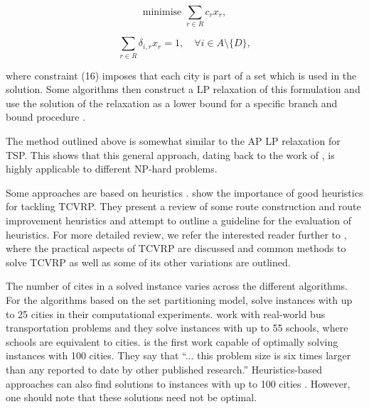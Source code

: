 \documentclass{mprop}
\theoremstyle{definition}
\begin{document}
\begin{equation}
\label{eq:tcvrpobjfunc}
\textrm{minimise } \sum_{r \in R} c_{r} x_{r},
\end{equation}

\begin{equation}
\label{eq:tcvrpconstraint1}
\sum_{r \in R} \delta_{i,r} x_{r} = 1, \quad \forall i \in A \setminus \{D\},
\end{equation}

where constraint (16) imposes that each city is part of a set which is used in the solution. Some algorithms then construct a LP relaxation of this formulation and use the solution of the relaxation as a lower bound for a specific branch and bound procedure \citep{Desrochers92,Agarwal89}.

The method outlined above is somewhat similar to the AP LP relaxation for TSP. This shows that this general approach, dating back to the work of \citet{Dantzig54}, is highly applicable to different NP-hard problems.

Some approaches are based on heuristics \citep{Tan99heuristicmethods,Cheng09}. \citet{Braysy05,Braysy05a} show the importance of good heuristics for tackling TCVRP. They present a review of some route construction and route improvement heuristics and attempt to outline a guideline for the evaluation of heuristics.
For more detailed review, we refer the interested reader further to \citet{Toth14}, where the practical aspects of TCVRP are discussed and common methods to solve TCVRP as well as some of its other variations are outlined.

The number of cites in a solved instance varies across the different algorithms. For the algorithms based on the set partitioning model, \citet{Agarwal89} solve instances with up to 25 cities in their computational experiments. \citet{Desrosiers84} work with real-world bus transportation problems and they solve instances with up to 55 schools, where schools are equivalent to cities. \citet{Desrochers92} is the first work capable of optimally solving instances with 100 cities. They say that ``... this problem size is six times larger than any reported to date by other published research.''
Heuristics-based approaches can also find solutions to instances with up to 100 cities \citep{Tan99heuristicmethods}. However, one should note that these solutions need not be optimal.

\end{document}

